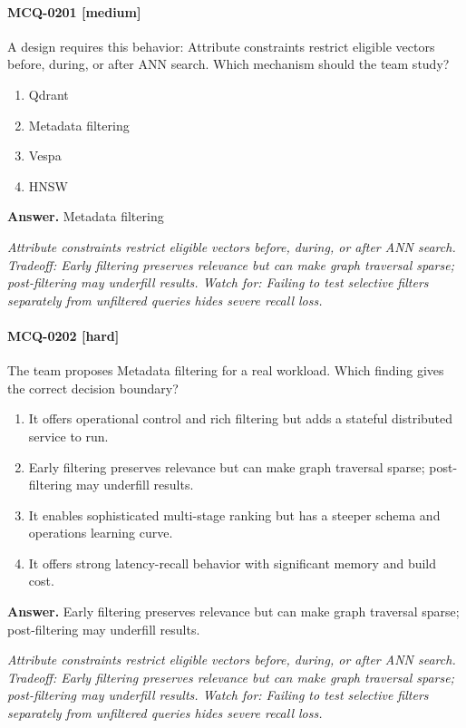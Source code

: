 \paragraph{MCQ-0201 [medium]} A design requires this behavior: Attribute constraints restrict eligible vectors before, during, or after ANN search. Which mechanism should the team study?
\begin{enumerate}[label=\Alph*.]
\item Qdrant
\item Metadata filtering
\item Vespa
\item HNSW
\end{enumerate}
\noindent\textbf{Answer.} Metadata filtering
\par\textit{Attribute constraints restrict eligible vectors before, during, or after ANN search. Tradeoff: Early filtering preserves relevance but can make graph traversal sparse; post-filtering may underfill results. Watch for: Failing to test selective filters separately from unfiltered queries hides severe recall loss.}
\paragraph{MCQ-0202 [hard]} The team proposes Metadata filtering for a real workload. Which finding gives the correct decision boundary?
\begin{enumerate}[label=\Alph*.]
\item It offers operational control and rich filtering but adds a stateful distributed service to run.
\item Early filtering preserves relevance but can make graph traversal sparse; post-filtering may underfill results.
\item It enables sophisticated multi-stage ranking but has a steeper schema and operations learning curve.
\item It offers strong latency-recall behavior with significant memory and build cost.
\end{enumerate}
\noindent\textbf{Answer.} Early filtering preserves relevance but can make graph traversal sparse; post-filtering may underfill results.
\par\textit{Attribute constraints restrict eligible vectors before, during, or after ANN search. Tradeoff: Early filtering preserves relevance but can make graph traversal sparse; post-filtering may underfill results. Watch for: Failing to test selective filters separately from unfiltered queries hides severe recall loss.}
